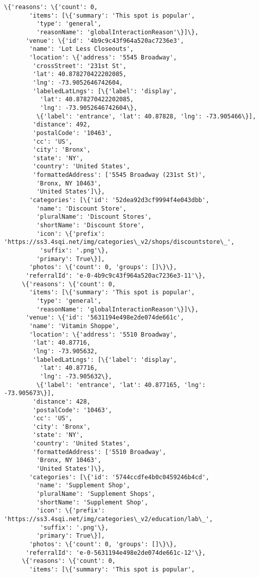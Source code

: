 \documentclass[11pt]{article}
\begin{document}
\begin{tcolorbox}[breakable, size=fbox, boxrule=.5pt, pad at break*=1mm, opacityfill=0]
\begin{Verbatim}[commandchars=\\\{\}]
     \{'reasons': \{'count': 0,
       'items': [\{'summary': 'This spot is popular',
         'type': 'general',
         'reasonName': 'globalInteractionReason'\}]\},
      'venue': \{'id': '4b9c9c43f964a520ac7236e3',
       'name': 'Lot Less Closeouts',
       'location': \{'address': '5545 Broadway',
        'crossStreet': '231st St',
        'lat': 40.878270422202085,
        'lng': -73.9052646742604,
        'labeledLatLngs': [\{'label': 'display',
          'lat': 40.878270422202085,
          'lng': -73.9052646742604\},
         \{'label': 'entrance', 'lat': 40.87828, 'lng': -73.905466\}],
        'distance': 492,
        'postalCode': '10463',
        'cc': 'US',
        'city': 'Bronx',
        'state': 'NY',
        'country': 'United States',
        'formattedAddress': ['5545 Broadway (231st St)',
         'Bronx, NY 10463',
         'United States']\},
       'categories': [\{'id': '52dea92d3cf9994f4e043dbb',
         'name': 'Discount Store',
         'pluralName': 'Discount Stores',
         'shortName': 'Discount Store',
         'icon': \{'prefix':
'https://ss3.4sqi.net/img/categories\_v2/shops/discountstore\_',
          'suffix': '.png'\},
         'primary': True\}],
       'photos': \{'count': 0, 'groups': []\}\},
      'referralId': 'e-0-4b9c9c43f964a520ac7236e3-11'\},
     \{'reasons': \{'count': 0,
       'items': [\{'summary': 'This spot is popular',
         'type': 'general',
         'reasonName': 'globalInteractionReason'\}]\},
      'venue': \{'id': '5631194e498e2de074de661c',
       'name': 'Vitamin Shoppe',
       'location': \{'address': '5510 Broadway',
        'lat': 40.87716,
        'lng': -73.905632,
        'labeledLatLngs': [\{'label': 'display',
          'lat': 40.87716,
          'lng': -73.905632\},
         \{'label': 'entrance', 'lat': 40.877165, 'lng': -73.905673\}],
        'distance': 428,
        'postalCode': '10463',
        'cc': 'US',
        'city': 'Bronx',
        'state': 'NY',
        'country': 'United States',
        'formattedAddress': ['5510 Broadway',
         'Bronx, NY 10463',
         'United States']\},
       'categories': [\{'id': '5744ccdfe4b0c0459246b4cd',
         'name': 'Supplement Shop',
         'pluralName': 'Supplement Shops',
         'shortName': 'Supplement Shop',
         'icon': \{'prefix':
'https://ss3.4sqi.net/img/categories\_v2/education/lab\_',
          'suffix': '.png'\},
         'primary': True\}],
       'photos': \{'count': 0, 'groups': []\}\},
      'referralId': 'e-0-5631194e498e2de074de661c-12'\},
     \{'reasons': \{'count': 0,
       'items': [\{'summary': 'This spot is popular',

\end{Verbatim}
\end{tcolorbox}
\end{document}

